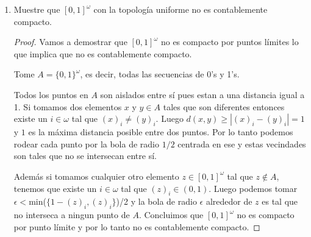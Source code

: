 \documentclass[letter,twoside,12pt]{article}
\begin{document}
\begin{enumerate}
\begin{proof}
$ "\Rightarrow" $. Sea $ x \in \{0,1\}^I $ tal que $ \{A \in I: x(A)=1\} $ es un ultrafiltro y tome $ U $ cualquier vecindad básica de $ x $. Estas vecindades se pueden ver como finitas restricciones sobre las coordenadas de $ \{0,1\}^I $. Sean $ A_1, \cdots A_n $ las coordenadas, donde la restricción es que para cualquier $ u \in U $ $ u(A_i)=1 $ y sean $ B_1, \cdots B_m $ las correspondientes donde para cualquier $u \in U $ $ u(B_i)=0 $. Por nuestra suposición que $ \{A \in I: x(A)=1\} $ es un ultrafiltro tenemos que $ u(\mathbb{N}\backslash B_i) = 1 $ y además que $ u(A_1 \cap \cdots \cap A_n \cap \mathbb{N} \backslash B_1 \cap \cdots \cap \mathbb{N} \backslash B_m)=1 $ y que $ A_1 \cap \cdots \cap A_n \cap \mathbb{N} \backslash B_1 \cap \cdots \cap \mathbb{N} \backslash B_m \not = \emptyset $. Entonces existe un $ n $ en el conjunto anterior y el $ p_n $ correspondiente cumple todas las restricciones por lo que pertenece a $ U $. Concluimos que $ x \in \overline{P} $.
\end{proof}

\item  Muestre que $ [0,1]^\omega $ con la topología uniforme no es contablemente compacto.

\begin{proof}
Vamos a demostrar que $ [0,1]^\omega $ no es compacto por puntos límites lo que implica que no es contablemente compacto.

Tome $ A = \{0,1\}^\omega $, es decir, todas las secuencias de 0's y 1's.

Todos los puntos en $ A $ son aislados entre sí pues estan a una distancia igual a 1. Si tomamos dos elementos $ x $ y $ y \in A$  tales que son diferentes entonces existe un $ i \in \omega $ tal que $ (x)_i \not = (y)_i $. Luego $ d(x,y)\geq |(x)_i-(y)_i|=1 $ y $ 1 $ es la máxima distancia posible entre dos puntos. Por lo tanto podemos rodear cada punto por la bola de radio $ 1/2 $ centrada en ese y estas vecindades son tales que no se intersecan entre sí. 

Además si tomamos cualquier otro elemento $ z \in [0,1]^\omega  $ tal que $ z \not \in A $, tenemos que existe un $ i \in \omega $ tal que $ (z)_i \in (0,1) $. Luego podemos tomar $ \epsilon < $min($\{ 1-(z)_i,(z)_i\}$)/2 y la bola de radio $ \epsilon $ alrededor de $ z $ es tal que no interseca a ningun punto de $ A $. Concluimos que $ [0,1]^\omega $ no es compacto por punto límite y por lo tanto no es contablemente compacto.
\end{proof}


\end{enumerate}
\end{document}
